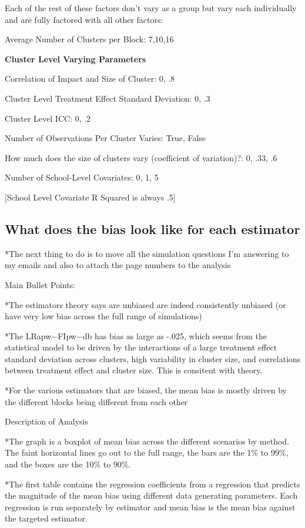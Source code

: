 \documentclass[
]{article}
\begin{document}
Each of the rest of these factors don't vary as a group but vary each
individually and are fully factored with all other factors:

Average Number of Clusters per Block: 7,10,16

\textbf{Cluster Level Varying Parameters}

Correlation of Impact and Size of Cluster: 0, .8

Cluster Level Treatment Effect Standard Deviation: 0, .3

Cluster Level ICC: 0, .2

Number of Observations Per Cluster Varies: True, False

How much does the size of clusters vary (coefficient of variation)?: 0,
.33, .6

Number of School-Level Covariates: 0, 1, 5

{[}School Level Covariate R Squared is always .5{]}

\subsection{What does the bias look like for each
estimator}\label{what-does-the-bias-look-like-for-each-estimator}

*The next thing to do is to move all the simulation questions I'm
answering to my emails and also to attach the page numbers to the
analysis

Main Bullet Points:

*The estimators theory says are unbiased are indeed consistently
unbiased (or have very low bias across the full range of simulations)

*The LRapw−FIpw−db has bias as large as -.025, which seems from the
statistical model to be driven by the interactions of a large treatment
effect standard deviation across clusters, high variability in cluster
size, and correlations between treatment effect and cluster size. This
is consitent with theory.

*For the various estimators that are biased, the mean bias is mostly
driven by the different blocks being different from each other

Description of Analysis

*The graph is a boxplot of mean bias across the different scenarios by
method. The faint horizontal lines go out to the full range, the bars
are the 1\% to 99\%, and the boxes are the 10\% to 90\%.

*The first table contains the regression coefficients from a regression
that predicts the magnitude of the mean bias using different data
generating parameters. Each regression is run separately by estimator
and mean bias is the mean bias against the targeted estimator.
\end{document}
